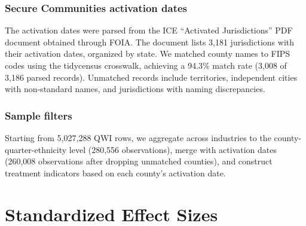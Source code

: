 \documentclass[12pt]{article}
\begin{document}
\subsubsection*{Secure Communities activation dates} The activation dates were parsed from the ICE ``Activated Jurisdictions'' PDF document obtained through FOIA. The document lists 3,181 jurisdictions with their activation dates, organized by state. We matched county names to FIPS codes using the tidycensus crosswalk, achieving a 94.3\% match rate (3,008 of 3,186 parsed records). Unmatched records include territories, independent cities with non-standard names, and jurisdictions with naming discrepancies.

\subsubsection*{Sample filters} Starting from 5,027,288 QWI rows, we aggregate across industries to the county-quarter-ethnicity level (280,556 observations), merge with activation dates (260,008 observations after dropping unmatched counties), and construct treatment indicators based on each county's activation date.

\section{Standardized Effect Sizes}
\label{sec:sde}


\end{document}
